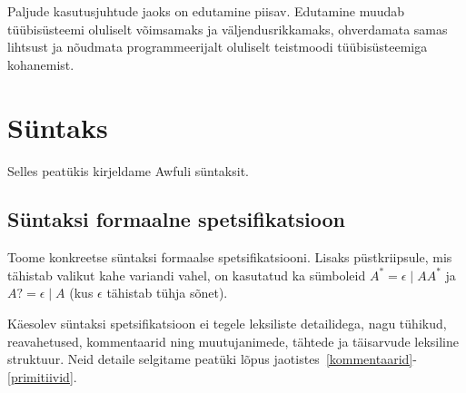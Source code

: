 \documentclass[12pt]{article}
\newcommand\peatykk[1]{
  \clearpage
  \section{#1}}
\begin{document}
      Paljude kasutusjuhtude jaoks on edutamine piisav. Edutamine muudab tüübisüsteemi oluliselt võimsamaks ja väljendusrikkamaks, ohverdamata samas lihtsust ja nõudmata programmeerijalt oluliselt teistmoodi tüübisüsteemiga kohanemist.
\begin{comment}
  \begin{frame}[fragile]{Promotion Without GADT-s?}
    Many GADT-s in the examples have a certain pattern:
    \begin{itemize}
      \item
        The kind of the new type constructor \verb!F! starts with \verb!K L1 ... Ln! where \verb!K! is a kind constructor promoted from an algebraic data type.
      \item
        The first type argument of the resulting \verb!F! is a type constructor applied to some type variables.
      \item
        For every constructor \verb!MakeK! of \verb!K!, we write exactly one data constructor. The first type argument of the resulting \verb!F! is constructed with \verb!MakeK!.
      \item
        For each data constructor that we create, the other type arguments of the resulting \verb!F! are type variables.
      \item
        All type variables used in the resulting \verb!F! are different.
    \end{itemize}
    The two examples shown that do not conform to this rule - \verb!Fin! and \verb!Sum! - can also be done by relaxing only the third rule (allowing zero or more than one data constructor of \verb!F! for each type constructor of \verb!K!).
\end{comment}
  \peatykk{Süntaks}\label{syntaks}
    Selles peatükis kirjeldame Awfuli süntaksit.
    \subsection{Süntaksi formaalne spetsifikatsioon}
    Toome konkreetse süntaksi formaalse spetsifikatsiooni. Lisaks püstkriipsule, mis tähistab valikut kahe variandi vahel, on kasutatud ka sümboleid $A^*=\epsilon\mid AA^*$ ja $A?=\epsilon\mid A$ (kus $\epsilon$ tähistab tühja sõnet).

    Käesolev süntaksi spetsifikatsioon ei tegele leksiliste detailidega, nagu tühikud, reavahetused, kommentaarid ning muutujanimede, tähtede ja täisarvude leksiline struktuur. Neid detaile selgitame peatüki lõpus jaotistes~\ref{kommentaarid}-\ref{primitiivid}.
\end{document}
